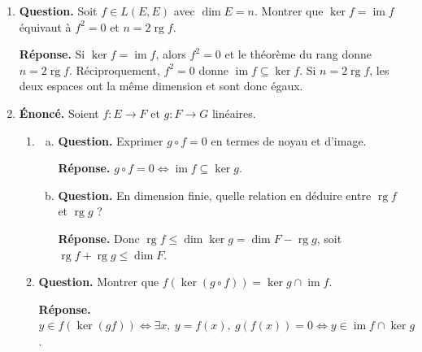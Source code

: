 \documentclass[12pt, a4paper]{article}
\begin{document}
\begin{enumerate}[label=7.\arabic*., start=68]
\begin{minipage}[t]{\linewidth}
\begin{enumerate}[\arabic*.]
        La version correcte est $\widetilde{\mathcal G}_i=\{u:\bigoplus_{j\neq i}F_j\subseteq\ker u\}$.
        Alors $u=\sum_i up_i$ est l'unique décomposition, donc $L(E,E)=\bigoplus_i\widetilde{\mathcal G}_i$.
        Pour $n=2$, la formule imprimée est vraie, les deux indices étant échangés. Pour $n=1$ et $E\neq0$, elle est fausse car $\mathcal G_1=\{0\}$.

\end{enumerate}
\end{minipage}

  \item \begin{minipage}[t]{\linewidth}\raggedright
\textbf{Question.} Soit $f\in L(E,E)$ avec $\dim E=n$. Montrer que $\ker f=\operatorname{im}f$ équivaut à $f^2=0$ et $n=2\operatorname{rg}f$.
\par\smallskip
\textbf{Réponse.} Si $\ker f=\operatorname{im}f$, alors $f^2=0$ et le théorème du rang donne $n=2\operatorname{rg}f$.
    Réciproquement, $f^2=0$ donne $\operatorname{im}f\subseteq\ker f$.
    Si $n=2\operatorname{rg}f$, les deux espaces ont la même dimension et sont donc égaux.
\end{minipage}

  \item \begin{minipage}[t]{\linewidth}\raggedright
\textbf{Énoncé.} Soient $f:E\to F$ et $g:F\to G$ linéaires.

\begin{enumerate}[\arabic*.]
        \item \begin{enumerate}[a.]
            \item \textbf{Question.} Exprimer $g\circ f=0$ en termes de noyau et d’image.
\par\smallskip
\textbf{Réponse.} $g\circ f=0\iff\operatorname{im}f\subseteq\ker g$.

  \item \textbf{Question.} En dimension finie, quelle relation en déduire entre $\operatorname{rg}f$ et $\operatorname{rg}g$ ?
\par\smallskip
\textbf{Réponse.} Donc $\operatorname{rg}f\leq\dim\ker g=\dim F-\operatorname{rg}g$, soit $\operatorname{rg}f+\operatorname{rg}g\leq\dim F$.

\end{enumerate}

  \item \textbf{Question.} Montrer que $f(\ker(g\circ f))=\ker g\cap\operatorname{im}f$.
\par\smallskip
\textbf{Réponse.} $y\in f(\ker(gf))\iff\exists x,\ y=f(x),\ g(f(x))=0
        \iff y\in\operatorname{im}f\cap\ker g$.


\end{enumerate}
\end{minipage}
\end{enumerate}
\end{document}
